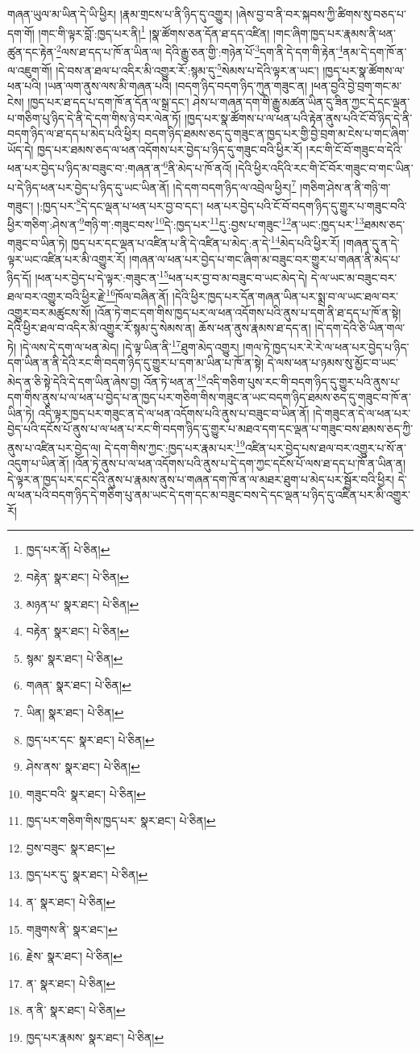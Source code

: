 གཞན་ཡུལ་མ་ཡིན་དེ་ཡི་ཕྱིར། །རྣམ་གྲངས་པ་ནི་ཉིད་དུ་འགྱུར། །ཞེས་བྱ་བ་ནི་བར་སྐབས་ཀྱི་ཚིགས་སུ་བཅད་པ་དག་གོ། །གང་གི་ལྟར་བློ་:ཁྱད་པར་ནི།\footnote{ཁྱད་པར་ནོ།  པེ་ཅིན། } །སྣ་ཚོགས་ཅན་དོན་ཐ་དད་འཛིན། །གང་ཞིག་ཁྱད་པར་རྣམས་ནི་ཕན་ཚུན་དང་རྟེན་\footnote{བརྟེན་  སྣར་ཐང་།  པེ་ཅིན། }ལས་ཐ་དད་པ་ཁོ་ན་ཡིན་ལ། དེའི་རྒྱུ་ཅན་གྱི་:གཉེན་པོ་\footnote{མཉན་པ་  སྣར་ཐང་།  པེ་ཅིན། }དག་ནི་དེ་དག་གི་རྟེན་\footnote{བརྟེན་  སྣར་ཐང་།  པེ་ཅིན། }ནམ་དེ་དག་ཁོ་ན་ལ་འཇུག་གོ། །དེ་བས་ན་ཐལ་པ་འདིར་མི་འགྱུར་རོ་:སྙམ་དུ་\footnote{སྙམ་  སྣར་ཐང་།  པེ་ཅིན། }སེམས་པ་དེའི་ལྟར་ན་ཡང་། །ཁྱད་པར་སྣ་ཚོགས་ལ་ཕན་པའི། །ཡན་ལག་ནུས་ལས་མི་གཞན་པའི། །བདག་ཉིད་བདག་ཉིད་ཀུན་གཟུང་ན། །ཕན་བྱའི་བྱེ་བྲག་གང་མ་ངེས། །ཁྱད་པར་ཐ་དད་པ་དག་ཁོ་ན་དོན་ལ་སྒྲ་དང་། ཤེས་པ་གཞན་དག་གི་རྒྱུ་མཚན་ཡིན་དུ་ཟིན་ཀྱང་དེ་དང་ལྡན་པ་གཅིག་པུ་ཉིད་དེ་ནི་དེ་དག་གིས་ཉེ་བར་ལེན་ཏོ། །ཁྱད་པར་སྣ་ཚོགས་པ་ལ་ཕན་པའི་རྟེན་ནུས་པའི་ངོ་བོ་ཉིད་དེ་ནི་བདག་ཉིད་ལ་ཐ་དད་པ་མེད་པའི་ཕྱིར། བདག་ཉིད་ཐམས་ཅད་དུ་གཟུང་ན་ཁྱད་པར་གྱི་བྱེ་བྲག་མ་ངེས་པ་གང་ཞིག་ཡོད་དེ། ཁྱད་པར་ཐམས་ཅད་ལ་ཕན་འདོགས་པར་བྱེད་པ་ཉིད་དུ་གཟུང་བའི་ཕྱིར་རོ། །རང་གི་ངོ་བོ་གཟུང་བ་དེའི་ཕན་པར་བྱེད་པ་ཉིད་མ་བཟུང་བ་:གཞན་ན་\footnote{གཞན་  སྣར་ཐང་།  པེ་ཅིན། }ནི་མེད་པ་ཁོ་ནའོ། །དེའི་ཕྱིར་འདིའི་རང་གི་ངོ་བོར་གཟུང་བ་གང་ཡིན་པ་དེ་ཉིད་ཕན་པར་བྱེད་པ་ཉིད་དུ་ཡང་ཡིན་ནོ། །དེ་དག་བདག་ཉིད་ལ་འབྲེལ་ཕྱིར།\footnote{ཡིན།  སྣར་ཐང་།  པེ་ཅིན། } །གཅིག་ཤེས་ན་ནི་གཉི་ག་གཟུང་། །:ཁྱད་པར་\footnote{ཁྱད་པར་དང་  སྣར་ཐང་།  པེ་ཅིན། }དེ་དང་ལྡན་པ་ཕན་པར་བྱ་བ་དང་། ཕན་པར་བྱེད་པའི་ངོ་བོ་བདག་ཉིད་དུ་གྱུར་པ་གཟུང་བའི་ཕྱིར་གཅིག་:ཤེས་ན་\footnote{ཤེས་ནས་  སྣར་ཐང་།  པེ་ཅིན། }གཉི་ག་:གཟུང་བས་\footnote{གཟུང་བའི་  སྣར་ཐང་།  པེ་ཅིན། }དེ་:ཁྱད་པར་\footnote{ཁྱད་པར་གཅིག་གིས་ཁྱད་པར་  སྣར་ཐང་།  པེ་ཅིན། }དུ་:བྱས་པ་གཟུང་\footnote{བྱས་བཟུང་  སྣར་ཐང་། }ན་ཡང་:ཁྱད་པར་\footnote{ཁྱད་པར་དུ་  སྣར་ཐང་།  པེ་ཅིན། }ཐམས་ཅད་གཟུང་བ་ཡིན་ཏེ། ཁྱད་པར་དང་ལྡན་པ་འཛིན་པ་ནི་དེ་འཛིན་པ་མེད་:ན་དེ་\footnote{ན་  སྣར་ཐང་།  པེ་ཅིན། }མེད་པའི་ཕྱིར་རོ། །གཞན་དུ་ན་དེ་ལྟར་ཡང་འཛིན་པར་མི་འགྱུར་རོ། །གཞན་ལ་ཕན་པར་བྱེད་པ་གང་ཞིག་མ་བཟུང་བར་གྱུར་པ་གཞན་ནི་མེད་པ་ཉིད་དོ། །ཕན་པར་བྱེད་པ་དེ་ལྟར་:གཟུང་ན་\footnote{གཟུགས་ནི་  སྣར་ཐང་། }ཕན་པར་བྱ་བ་མ་བཟུང་བ་ཡང་མེད་དེ། དེ་ལ་ཡང་མ་བཟུང་བར་ཐལ་བར་འགྱུར་བའི་ཕྱིར་རྗེ་\footnote{རྗེས་  སྣར་ཐང་།  པེ་ཅིན། }ཁོལ་བཞིན་ནོ། །དེའི་ཕྱིར་ཁྱད་པར་དོན་གཞན་ཡིན་པར་སྨྲ་བ་ལ་ཡང་ཐལ་བར་འགྱུར་བར་མཚུངས་སོ། །འོན་ཏེ་གང་དག་གིས་ཁྱད་པར་ལ་ཕན་འདོགས་པའི་ནུས་པ་དག་ནི་ཐ་དད་པ་ཁོ་ན་སྟེ། དེའི་ཕྱིར་ཐལ་བ་འདིར་མི་འགྱུར་རོ་སྙམ་དུ་སེམས་ན། ཆོས་ཕན་ནུས་རྣམས་ཐ་དད་ན། །དེ་དག་དེའི་ཅི་ཡིན་གལ་ཏེ། །དེ་ལས་དེ་དག་ལ་ཕན་མེད། །དེ་ལྟ་ཡིན་ནི་\footnote{ན་  སྣར་ཐང་།  པེ་ཅིན། }ཐུག་མེད་འགྱུར། །གལ་ཏེ་ཁྱད་པར་རེ་རེ་ལ་ཕན་པར་བྱེད་པ་ཉིད་དག་ཡིན་ན་ནི་དེའི་རང་གི་བདག་ཉིད་དུ་གྱུར་པ་དག་མ་ཡིན་པ་ཁོ་ན་སྟེ། དེ་ལས་ཕན་པ་ཉམས་སུ་མྱོང་བ་ཡང་མེད་ན་ཅི་སྟེ་དེའི་དེ་དག་ཡིན་ཞེས་བྱ། འོན་ཏེ་ཕན་ན་\footnote{ན་ནི་  སྣར་ཐང་།  པེ་ཅིན། }འདི་གཅིག་པུས་རང་གི་བདག་ཉིད་དུ་གྱུར་པའི་ནུས་པ་དག་གིས་ནུས་པ་ལ་ཕན་པ་བྱེད་པ་ན་ཁྱད་པར་གཅིག་གིས་གཟུང་ན་ཡང་བདག་ཉིད་ཐམས་ཅད་དུ་གཟུང་བ་ཁོ་ན་ཡིན་ཏེ། འདི་ལྟར་ཁྱད་པར་གཟུང་ན་དེ་ལ་ཕན་འདོགས་པའི་ནུས་པ་བཟུང་བ་ཡིན་ནོ། །དེ་གཟུང་ན་དེ་ལ་ཕན་པར་བྱེད་པའི་དངོས་པོ་ནུས་པ་ལ་ཕན་པ་རང་གི་བདག་ཉིད་དུ་གྱུར་པ་མཐའ་དག་དང་ལྡན་པ་གཟུང་བས་ཐམས་ཅད་ཀྱི་ནུས་པ་འཛིན་པར་བྱེད་ལ། དེ་དག་གིས་ཀྱང་:ཁྱད་པར་རྣམ་པར་\footnote{ཁྱད་པར་རྣམས་  སྣར་ཐང་།  པེ་ཅིན། }འཛིན་པར་བྱེད་པས་ཐལ་བར་འགྱུར་པ་སོ་ན་འདུག་པ་ཡིན་ནོ། །འོན་ཏེ་ནུས་པ་ལ་ཕན་འདོགས་པའི་ནུས་པ་དེ་དག་ཀྱང་དངོས་པོ་ལས་ཐ་དད་པ་ཁོ་ན་ཡིན་ན། དེ་ལྟར་ན་ཁྱད་པར་དང་དེའི་ནུས་པ་རྣམས་ནུས་པ་གཞན་དག་ཁོ་ན་ལ་མཐར་ཐུག་པ་མེད་པར་སྦྱོར་བའི་ཕྱིར། དེ་ལ་ཕན་པའི་བདག་ཉིད་དེ་གཅིག་པུ་ནམ་ཡང་དེ་དག་དང་མ་བཟུང་བས་དེ་དང་ལྡན་པ་ཉིད་དུ་འཛིན་པར་མི་འགྱུར་རོ། 
